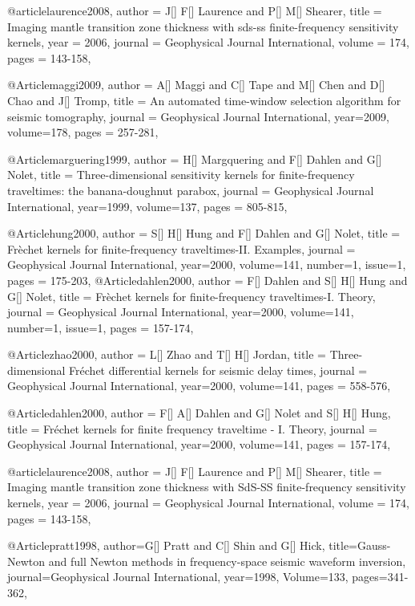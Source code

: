 @article{laurence2008,
author = {J[] F[] Laurence and P[] M[] Shearer},
title = {Imaging mantle transition zone thickness with sds-ss finite-frequency sensitivity kernels},
year = {2006},
journal = {Geophysical Journal International},
volume = {174},
pages = {143-158},
}



@Article{maggi2009,
  author =	 {A[] Maggi and C[] Tape and M[] Chen and D[] Chao and J[] Tromp},
  title =	 {An automated time-window selection algorithm for seismic tomography},
  journal =	 {Geophysical Journal International},
  year=2009,
  volume=178,
  pages =	 {257-281},
}

@Article{marguering1999,
  author =	 {H[] Margquering and F[] Dahlen and G[] Nolet},
  title =	 {Three-dimensional sensitivity kernels for finite-frequency traveltimes: the banana-doughnut parabox},
  journal =	 {Geophysical Journal International},
  year=1999,
  volume=137,
  pages =	 {805-815},
}

@Article{hung2000,
  author =	 {S[] H[] Hung and F[] Dahlen and G[] Nolet},
  title =	 {Fr\`{e}chet kernels for finite-frequency traveltimes-II. Examples},
  journal =	 {Geophysical Journal International},
  year=2000,
  volume=141,
  number=1,
  issue=1,
  pages =	 {175-203},
}
@Article{dahlen2000,
  author =	 { F[] Dahlen and S[] H[] Hung and G[] Nolet},
  title =	 {Fr\`{e}chet kernels for finite-frequency traveltimes-I. Theory},
  journal =	 {Geophysical Journal International},
  year=2000,
  volume=141,
  number=1,
  issue=1,
  pages =	 {157-174},
}

@Article{zhao2000,
  author =	 {L[] Zhao and T[] H[] Jordan},
  title =	 {Three-dimensional Fr\'{e}chet differential kernels for seismic delay times},
  journal =	 {Geophysical Journal International},
  year=2000,
  volume=141,
  pages =	 {558-576},
}

@Article{dahlen2000,
  author =	 {F[] A[] Dahlen and G[] Nolet and S[] H[] Hung},
  title =	 {Fr\'{e}chet kernels for finite frequency traveltime - {I}. Theory},
  journal =	 {Geophysical Journal International},
  year=2000,
  volume=141,
  pages =	 {157-174},
}

@article{laurence2008,
author = {J[] F[] Laurence and P[] M[] Shearer},
title = {Imaging mantle transition zone thickness with {S}d{S-SS} finite-frequency sensitivity kernels},
year = {2006},
journal = {Geophysical Journal International},
volume = {174},
pages = {143-158},
}

@Article{pratt1998,
  author={G[] Pratt and C[] Shin and G[] Hick},
  title={Gauss-{N}ewton and full {N}ewton methods in frequency-space seismic waveform inversion},
  journal={Geophysical Journal International},
  year=1998,
  Volume=133,
  pages={341-362},
}

